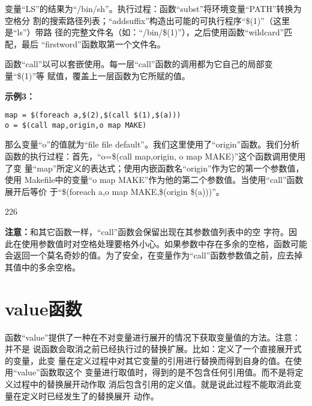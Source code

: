 变量“LS”的结果为“/bin/sh”。执行过程：函数“subst”将环境变量“PATH”转换为空格分
割的搜索路径列表；“addsuffix”构造出可能的可执行程序“\$(1)”（这里是“ls”）带路
径的完整文件名（如：“/bin/\$(1)”），之后使用函数“wildcard”匹配，最后
“firstword”函数取第一个文件名。

函数“call”以可以套嵌使用。每一层“call”函数的调用都为它自己的局部变量“\$(1)”等
赋值，覆盖上一层函数为它所赋的值。

\textbf{示例3：}
\begin{Verbatim}[]
map = $(foreach a,$(2),$(call $(1),$(a)))
o = $(call map,origin,o map MAKE)
\end{Verbatim}

那么变量“o”的值就为“file file default”。我们这里使用了“origin”函数。我们分析
函数的执行过程：首先，“o=\$(call map,origin, o map MAKE)”这个函数调用使用了变
量“map”所定义的表达式；使用内嵌函数名“origin”作为它的第一个参数值，使用
Makefile中的变量“o map MAKE”作为他的第二个参数值。当使用“call”函数展开后等价
于“\$(foreach a,o map MAKE,\$(origin \$(a)))”。


\begin{dinglist}{226}
\itemsep=4pt \parskip=0pt

\item \textbf{注意：}和其它函数一样，“call”函数会保留出现在其参数值列表中的空
    字符。因
    此在使用参数值时对空格处理要格外小心。如果参数中存在多余的空格，函数可能
    会返回一个莫名奇妙的值。为了安全，在变量作为“call”函数参数值之前，应去掉
    其值中的多余空格。

\end{dinglist}

\section{value函数}
函数“value”提供了一种在不对变量进行展开的情况下获取变量值的方法。注意：并不是
说函数会取消之前已经执行过的替换扩展。比如：定义了一个直接展开式的变量，此变
量在定义过程中对其它变量的引用进行替换而得到自身的值。在使用“value”函数取这个
变量进行取值时，得到的是不包含任何引用值。而不是将定义过程中的替换展开动作取
消后包含引用的定义值。就是说此过程不能取消此变量在定义时已经发生了的替换展开
动作。

